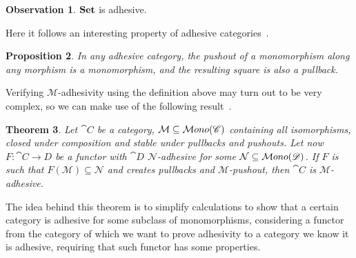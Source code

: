 \documentclass[a4paper, twoside,openright]{report}
\theoremstyle{plain}
\newtheorem{theorem}{Theorem}[section]
\newtheorem{prop}[theorem]{Proposition}
\theoremstyle{definition}
\newtheorem{obs}[theorem]{Observation}
\begin{document}
\begin{obs}
    $\mathbf{Set}$ is adhesive.
\end{obs}

Here it follows an interesting property of adhesive categories~\cite{lack2011embeddingtheoremadhesivecategories}.

\begin{prop}\label{prop:monos_are_preserved_by_pullbacks_in_adh_cats}
    In any adhesive category, the pushout of a monomorphism along any morphism is a monomorphism, and the resulting square is also a pullback.
\end{prop}

Verifying $\mathcal M$-adhesivity using the definition above may turn out to be very complex, so we can make use of the following result~\cite{castelnovo2022newcriterionmathcalmmathcalnadhesivity}. 

\begin{theorem}\label{th:crit_for_adh}
    Let $\cat C$ be a category, $\mathcal M \subseteq \mathcal{M}ono(\mathscr{C})$ containing all isomorphisms, closed under composition and stable under pullbacks and pushouts. Let now $F: \cat{C \rightarrow D}$ be a functor with $\cat D$ $\mathcal{N}$-adhesive for some $\mathcal{N} \subseteq \mathcal{M}ono(\mathscr{D})$.
    If $F$ is such that $F(\mathcal{M}) \subseteq \mathcal N$ and creates pullbacks and $\mathcal{M}$-pushout, then $\cat C$ is $\mathcal M$-adhesive.
\end{theorem}

The idea behind this theorem is to simplify calculations to show that a certain category is adhesive for some subclass of monomorphisms, considering a functor from the category of which we want to prove adhesivity to a category we know it is adhesive, requiring that such functor has some properties.
\end{document}

